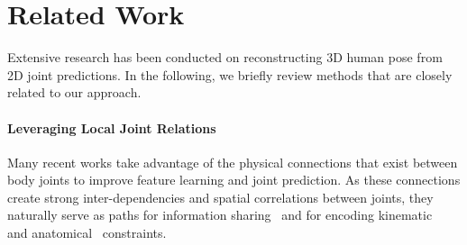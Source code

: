 \documentclass[runningheads]{llncs}
\begin{document}
\begin{comment}
To sum up, the main contributions of this work include:
\begin{itemize}
\item Inspired by skeleton kinematic prior and different dependencies of learning body joints, we explore a simple but efficient split-and-recombine connected layer of joints split strategies and recombine the global context as a low-dimensional representations.

\item We then propose a split-and-recombine convolution layer that can be easily adapted to the video-based 3D human pose estimation, which can get better performance(decrease errors by \% and need less parameters (\%)


\item Since we divide the whole body into different partitions, the model can learn parts externally, efficiently, and generalize well in distributed different data, like cross datasets conditions and on unseen pose. 

\end{itemize}

The rest of this paper is organized as follows. Section \ref{sec:related_work} reviews some recently related work. Section \ref{sec:method} explore kinds of baselines and introduces our approach with single and temporal pose estimation in detail. In Section \ref{sec:result}, we show the dataset settings and evaluation protocols. Section \ref{sec:analysis} analyzes the results in kinds of settings and conducts an ablation study. Finally, we conclude in Section \ref{sec:conclusion}.
\end{comment}


\section{Related Work}
\label{sec:related_work}

Extensive research has been conducted on reconstructing 3D human pose from 2D joint predictions. In the following, we briefly review methods that are closely related to our approach. 



\paragraph{\textbf{Leveraging Local Joint Relations}}

Many recent works take advantage of the physical connections that exist between body joints to improve feature learning and joint prediction. As these connections create strong inter-dependencies and spatial correlations between joints, they naturally serve as paths for information sharing~\cite{lee2018propagating,zhao2019semantic,cai2019exploiting,ci2019optimizing} and for encoding kinematic~\cite{fang2018learning} and anatomical~\cite{dabral2018learning,habibie2019wild,pavllo20193d,wandt2019repnet} constraints.
\end{document}
